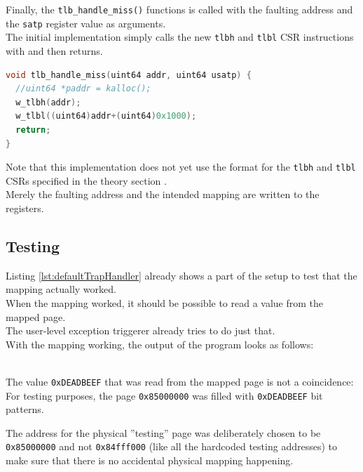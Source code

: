 Finally, the \texttt{tlb\_handle\_miss()} functions is called with the faulting address and the \texttt{satp} register
value as arguments.\\
The initial implementation simply calls the new \texttt{tlbh} and \texttt{tlbl} CSR instructions with and then
returns.
\begin{lstlisting}[language={C},float=h!,
    label={lst:defaultTrapHandler}, caption={Simple TLB Miss Exception handler for a single fixed address}]
void tlb_handle_miss(uint64 addr, uint64 usatp) {
  //uint64 *paddr = kalloc();
  w_tlbh(addr);
  w_tlbl((uint64)addr+(uint64)0x1000);
  return;
}
\end{lstlisting}

Note that this implementation does not yet use the format for the \texttt{tlbh} and \texttt{tlbl} CSRs specified
in the theory section .\\
Merely the faulting address and the intended mapping are written to the registers.

\subsection{Testing}
Listing \ref{lst:defaultTrapHandler} already shows a part of the setup to test that the mapping actually worked.\\
When the mapping worked, it should be possible to read a value from the mapped page.\\
The user-level exception triggerer already tries to do just that.\\
With the mapping working, the output of the program looks as follows:

\\

The value \texttt{0xDEADBEEF} that was read from the mapped page is not a coincidence:\\
For testing purposes, the page \texttt{0x85000000} was filled with \texttt{0xDEADBEEF} bit patterns.

The address for the physical ''testing'' page was deliberately chosen to be \texttt{0x85000000} and not
\texttt{0x84fff000} (like all the hardcoded testing addresses) to make sure that there is no accidental physical
mapping happening.\\



